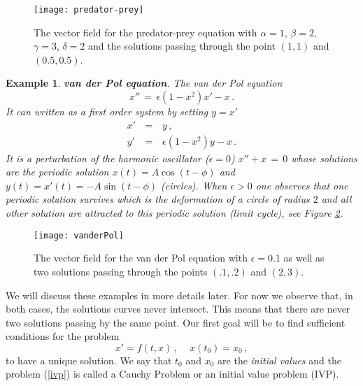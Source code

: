 \documentclass[12pt]{report}
\newtheorem{example}[theorem]{Example}
\newcommand{\nn}{\nonumber}
\def\eqref#1{(\ref{#1})}
\begin{document}
\begin{figure}[htbp]
\begin{center}
\texttt{[image: predator-prey]}
\caption{The vector field
for the predator-prey equation with $\alpha=1$, $\beta=2$, $\gamma=3$,
$\delta=2$ and the solutions passing through the point $(1,1)$ and
$(0.5,0.5)$.}
\label{prpr}
\end{center}
\end{figure}

\begin{example}{\rm {\bf van der Pol equation}. The van der Pol equation
\begin{equation} \label{vdp}
x''\,=\, \epsilon(1-x^2) x' - x \,.
\end{equation}
It can written as a first order system by setting $y=x'$
\begin{eqnarray}
x' \,&=&\, y \,,\nn \\
y' \,&=&\, \epsilon(1-x^2)y -x \,.
\end{eqnarray}  
It is a perturbation of the harmonic oscillator ($\epsilon=0$) $x'' +x
\,=\, 0$ whose solutions are the periodic solution $x(t) = A
\cos(t-\phi)$ and $y(t) = x'(t) =-A \sin(t- \phi)$ (circles).  When
$\epsilon >0$ one observes that one periodic solution survives which
is the deformation of a circle of radius $2$ and all other solution
are attracted to this periodic solution (limit cycle), see Figure \ref{vdpol}.
}
\end{example}

\begin{figure}[htbp]
\begin{center}
\texttt{[image: vanderPol]}
\caption{The vector field for the van der Pol equation with
$\epsilon=0.1$ as well as two solutions passing through the points
$(.1,.2)$ and $(2,3)$.}
\label{vdpol}
\end{center}
\end{figure}

We will discuss these examples in more details later. For now we
observe that, in both cases, the solutions curves never
intersect. This means that there are never two solutions passing by
the same point.  Our first goal will be to find sufficient conditions
for the problem
\begin{equation}\label{ivp}
x' = f(t,x) \,, \quad \, x(t_0) =x_0 \,,
\end{equation} 
to have a unique solution.  We say that $t_0$ and $x_0$ are the {\em
initial values} and the problem \eqref{ivp} is called a Cauchy Problem
or an initial value problem (IVP).
\end{document}
